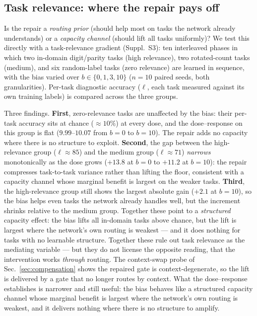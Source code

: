 \documentclass[review,12pt,number]{elsarticle}
\begin{document}
\subsection{Task relevance: where the repair pays off}
\label{sec:taskrel}

Is the repair a \emph{routing prior} (should help most on tasks the
network already understands) or a \emph{capacity channel} (should lift
all tasks uniformly)? We test this directly with a task-relevance
gradient (Suppl.~S3): ten interleaved phases in which two in-domain
digit/parity tasks (high relevance), two rotated-count tasks (medium),
and six random-label tasks (zero relevance) are learned in sequence,
with the bias varied over $b \in \{0,1,3,10\}$
($n{=}10$ paired seeds, both granularities). Per-task diagnostic
accuracy ($\ell$, each task measured against its own training labels)
is compared across the three groups.

Three findings. \textbf{First}, zero-relevance tasks are unaffected by
the bias: their per-task accuracy sits at chance
($\approx 10\%$) at every dose, and the dose--response on this group
is flat ($9.99$--$10.07$ from $b{=}0$ to $b{=}10$). The repair adds
no capacity where there is no structure to exploit. \textbf{Second},
the gap between the high-relevance group ($\ell \approx 85$) and the
medium group ($\ell \approx 71$) \emph{narrows} monotonically as the
dose grows ($+13.8$ at $b{=}0$ to $+11.2$ at $b{=}10$): the repair
compresses task-to-task variance rather than lifting the floor,
consistent with a capacity channel whose marginal benefit is largest on
the weaker tasks. \textbf{Third}, the high-relevance group still shows
the largest absolute gain ($+2.1$ at $b{=}10$), so the bias helps even
tasks the network already handles well, but the increment shrinks
relative to the medium group. Together these point to a
\emph{structured} capacity effect: the bias lifts all in-domain tasks
above chance, but the lift is largest where the network's own routing
is weakest --- and it does nothing for tasks with no learnable
structure. Together these rule out task relevance as the mediating
variable --- but they do not license the opposite reading, that the
intervention works \emph{through} routing. The context-swap probe of
Sec.~\ref{sec:compensation} shows the repaired gate is
context-degenerate, so the lift is delivered by a gate that no longer
routes by context. What the dose--response establishes is narrower and
still useful: the bias behaves like a structured capacity channel whose
marginal benefit is largest where the network's own routing is weakest,
and it delivers nothing where there is no structure to amplify.
\end{document}
